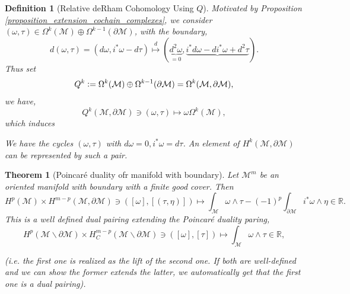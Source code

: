 \documentclass[10pt]{article}
\newtheorem{theorem}{Theorem} [section]
\newtheorem{definition}{Definition}[section]
\newcommand{\defeq}{\vcentcolon=}
\newcommand{\R}[0]{\mathbb{R}}
\newcommand{\M}[0]{\mathcal{M}}
\begin{document}
\begin{definition}[Relative deRham Cohomology Using $Q$]
  Motivated by Proposition \ref{proposition_extension_cochain_complexes}, we consider $(\omega,\tau)\in\Omega^k(\M)\oplus\Omega^{k-1}(\partial\M)$, with the boundary,
  \begin{equation*}
    d(\omega,\tau) = (d\omega,i^*\omega-d\tau) \stackrel{d}{\mapsto}(\underbrace{d^2\omega}_{=0},\underbrace{i^*d\omega-di^*\omega+d^2\tau}).
  \end{equation*}
  Thus set 
  \begin{equation*}
    Q^k \defeq\Omega^k(\M)\oplus\Omega^{k-1}(\partial\M)=\Omega^k(\M,\partial\M),
  \end{equation*}
  we have,
  \begin{equation*}
    Q^k(\M,\partial\M)\ni(\omega,\tau)\mapsto\omega\Omega^k(\M),
  \end{equation*}
  which induces 
  \begin{center}
  \end{center}
  We have the cycles $(\omega,\tau)$ with $d\omega=0,i^*\omega=d\tau$. An element of $H^k(\M,\partial\M)$ can be represented by such a pair.
\end{definition}
\begin{theorem}[Poincaré duality ofr manifold with boundary]
  Let $\M^m$ be an oriented manifold with boundary with a finite good cover. Then 
  \begin{equation*}
    H^p(\M)\times H^{m-p}(\M,\partial\M)\ni([\omega],[(\tau,\eta)])\longmapsto\int_\M\omega\wedge\tau-(-1)^p\int_{\partial\M}i^*\omega\wedge\eta\in\R.
  \end{equation*}
  This is a well defined dual pairing extending the Poincaré duality paring,
  \begin{equation*}
    H^p(\M\backslash\partial\M)\times H_C^{m-p}(\M\backslash\partial\M)\ni([\omega],[\tau])\mapsto\int_\M\omega\wedge\tau\in\R,
  \end{equation*}
  \begin{center}
  \end{center}
  (i.e. the first one is realized as the lift of the second one. If both are well-defined and we can show the former extends the latter, we automatically get that the first one is a dual pairing).
\end{theorem}
\end{document}

